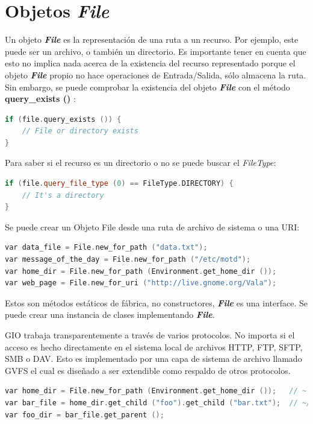 \documentclass[12pt,twoside]{book}
\begin{document}
\section{Objetos \textit{\textbf{File}}}


Un objeto \textit{\textbf{File}} es la representación de una ruta a un recurso. Por ejemplo, este puede ser un archivo, o también un directorio. Es importante tener en cuenta que esto no implica nada acerca de la existencia del recurso representado porque el objeto \textit{\textbf{File}} propio no hace operaciones de Entrada/Salida, sólo almacena la ruta. Sin embargo, se puede comprobar la existencia del objeto \textit{\textbf{File}} con el método \textbf{query\_exists ()} :

\begin{lstlisting}[language=C++]
if (file.query_exists ()) {
	// File or directory exists
}
\end{lstlisting}

Para saber si el recurso es un directorio o no se puede buscar el \textit{FileType}:

\begin{lstlisting}[language=C++]
if (file.query_file_type (0) == FileType.DIRECTORY) {
	// It's a directory
}
\end{lstlisting}

Se puede crear un Objeto File desde una ruta de archivo de sistema o una URI:

 
\begin{lstlisting}[language=C++] 
var data_file = File.new_for_path ("data.txt");
var message_of_the_day = File.new_for_path ("/etc/motd");
var home_dir = File.new_for_path (Environment.get_home_dir ());
var web_page = File.new_for_uri ("http://live.gnome.org/Vala");
\end{lstlisting}

Estos son métodos estáticos de fábrica, no constructores, \textbf{\textit{File}} es una interface. Se puede crear una instancia de clases implementando \textbf{\textit{File}}.


GIO trabaja transparentemente a través de varios protocolos. No importa si el acceso es hecho directamente en el sistema local de archivos HTTP, FTP, SFTP, SMB o DAV. Esto es implementado por una capa de sistema de archivo llamado GVFS el cual es diseñado a ser extendible como respaldo de otros protocolos.

\begin{lstlisting}[language=C++]
var home_dir = File.new_for_path (Environment.get_home_dir ());   // ~
var bar_file = home_dir.get_child ("foo").get_child ("bar.txt");  // ~/foo/bar.txt
var foo_dir = bar_file.get_parent ();
\end{lstlisting}
\end{document}
